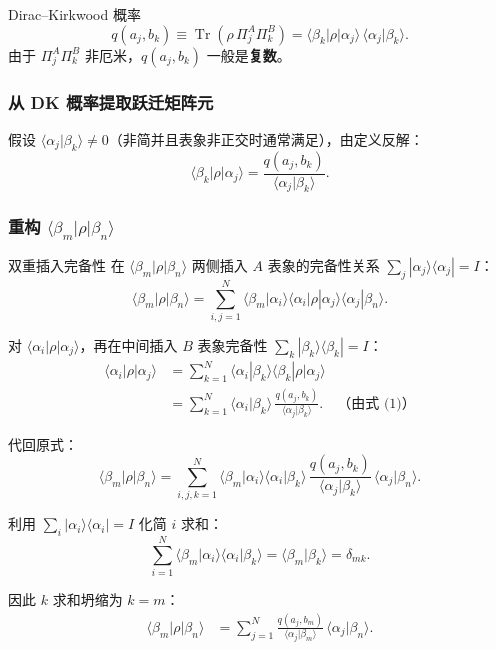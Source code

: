 \begin{modelbox}{Dirac--Kirkwood 概率}
\[
  q(a_j,b_k) \equiv \operatorname{Tr}(\rho\,\Pi_j^A\Pi_k^B) = \langle\beta_k|\rho|\alpha_j\rangle\,\langle\alpha_j|\beta_k\rangle.
\]
由于 $\Pi_j^A\Pi_k^B$ 非厄米，$q(a_j,b_k)$ 一般是\textbf{复数}。
\end{modelbox}

\subsubsection{从 DK 概率提取跃迁矩阵元}

假设 $\langle\alpha_j|\beta_k\rangle\neq 0$（非简并且表象非正交时通常满足），由定义反解：
\[
  \langle\beta_k|\rho|\alpha_j\rangle = \frac{q(a_j,b_k)}{\langle\alpha_j|\beta_k\rangle}. \tag{1}
\]

\subsubsection{重构 $\langle\beta_m|\rho|\beta_n\rangle$}

\begin{derivationbox}{双重插入完备性}
在 $\langle\beta_m|\rho|\beta_n\rangle$ 两侧插入 $A$ 表象的完备性关系 $\sum_j|\alpha_j\rangle\langle\alpha_j|=I$：
\[
  \langle\beta_m|\rho|\beta_n\rangle = \sum_{i,j=1}^N \langle\beta_m|\alpha_i\rangle\langle\alpha_i|\rho|\alpha_j\rangle\langle\alpha_j|\beta_n\rangle.
\]

对 $\langle\alpha_i|\rho|\alpha_j\rangle$，再在中间插入 $B$ 表象完备性 $\sum_k|\beta_k\rangle\langle\beta_k|=I$：
\begin{align*}
  \langle\alpha_i|\rho|\alpha_j\rangle
  &= \sum_{k=1}^N \langle\alpha_i|\beta_k\rangle\langle\beta_k|\rho|\alpha_j\rangle \\
  &= \sum_{k=1}^N \langle\alpha_i|\beta_k\rangle\,
     \frac{q(a_j,b_k)}{\langle\alpha_j|\beta_k\rangle}. \quad\text{（由式 (1)）}
\end{align*}

代回原式：
\[
  \langle\beta_m|\rho|\beta_n\rangle = \sum_{i,j,k=1}^N
  \langle\beta_m|\alpha_i\rangle\langle\alpha_i|\beta_k\rangle\,
  \frac{q(a_j,b_k)}{\langle\alpha_j|\beta_k\rangle}\,
  \langle\alpha_j|\beta_n\rangle.
\]

利用 $\sum_i|\alpha_i\rangle\langle\alpha_i|=I$ 化简 $i$ 求和：
\[
  \sum_{i=1}^N \langle\beta_m|\alpha_i\rangle\langle\alpha_i|\beta_k\rangle
  = \langle\beta_m|\beta_k\rangle = \delta_{mk}.
\]

因此 $k$ 求和坍缩为 $k=m$：
\begin{align*}
  \langle\beta_m|\rho|\beta_n\rangle
  &= \sum_{j=1}^N \frac{q(a_j,b_m)}{\langle\alpha_j|\beta_m\rangle}\,
     \langle\alpha_j|\beta_n\rangle.
\end{align*}
\end{derivationbox}


